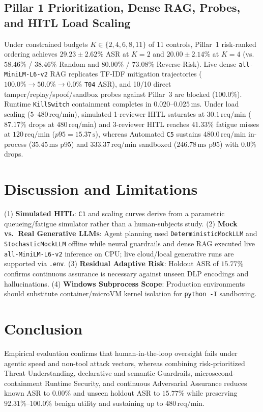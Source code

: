 \subsection{Pillar 1 Prioritization, Dense RAG, Probes, and HITL Load Scaling}
Under constrained budgets $K \in \{2, 4, 6, 8, 11\}$ of 11 controls, Pillar~1 risk-ranked ordering achieves $29.23 \pm 2.62\%$ ASR at $K=2$ and $20.00 \pm 2.14\%$ at $K=4$ (vs.\ $58.46\%$ / $38.46\%$ Random and $80.00\%$ / $73.08\%$ Reverse-Risk). Live dense \texttt{all-MiniLM-L6-v2} RAG replicates TF-IDF mitigation trajectories ($100.0\% \rightarrow 50.0\% \rightarrow 0.0\%$ \texttt{T04} ASR), and 10/10 direct tamper/replay/spoof/sandbox probes against Pillar~3 are blocked ($100.0\%$). Runtime \texttt{KillSwitch} containment completes in $0.020\text{--}0.025\,\text{ms}$. Under load scaling ($5\text{--}480\,\text{req/min}$), simulated 1-reviewer HITL saturates at $30.1\,\text{req/min}$ ($87.17\%$ drops at $480\,\text{req/min}$) and 3-reviewer HITL reaches $41.33\%$ fatigue misses at $120\,\text{req/min}$ ($p95=15.37\,\text{s}$), whereas Automated \texttt{C5} sustains $480.0\,\text{req/min}$ in-process ($35.45\,\text{ms}$ p95) and $333.37\,\text{req/min}$ sandboxed ($246.78\,\text{ms}$ p95) with $0.0\%$ drops.

\section{Discussion and Limitations}
(1) \textbf{Simulated HITL}: \texttt{C1} and scaling curves derive from a parametric queueing/fatigue simulator rather than a human-subjects study. (2) \textbf{Mock vs.\ Real Generative LLMs}: Agent planning used \texttt{DeterministicMockLLM} and \texttt{StochasticMockLLM} offline while neural guardrails and dense RAG executed live \texttt{all-MiniLM-L6-v2} inference on CPU; live cloud/local generative runs are supported via \texttt{.env}. (3) \textbf{Residual Adaptive Risk}: Holdout ASR of $15.77\%$ confirms continuous assurance is necessary against unseen DLP encodings and hallucinations. (4) \textbf{Windows Subprocess Scope}: Production environments should substitute container/microVM kernel isolation for \texttt{python -I} sandboxing.

\section{Conclusion}
Empirical evaluation confirms that human-in-the-loop oversight fails under agentic speed and non-tool attack vectors, whereas combining risk-prioritized Threat Understanding, declarative and semantic Guardrails, microsecond-containment Runtime Security, and continuous Adversarial Assurance reduces known ASR to $0.00\%$ and unseen holdout ASR to $15.77\%$ while preserving $92.31\%\text{--}100.0\%$ benign utility and sustaining up to $480\,\text{req/min}$.

